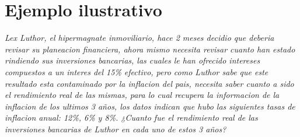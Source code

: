 \section*{Ejemplo ilustrativo}
\textit{Lex Luthor, el hipermagnate inmoviliario, hace 2 meses decidio que deberia revisar su planeacion financiera, ahora mismo necesita revisar cuanto han estado rindiendo sus inversiones bancarias, las cuales le han ofrecido intereses compuestos a un interes del 15\% efectivo, pero como Luthor sabe que este resultado esta contaminado por la inflacion del pais, necesita saber cuanto a sido el rendimiento real de las mismas, para lo cual recupera la informacion de la inflacion de los ultimos 3 años, los datos indican que hubo las siguientes tasas de inflacion anual: 12\%, 6\% y 8\%. ¿Cuanto fue el rendimiento real de las inversiones bancarias de Luthor en cada uno de estos 3 años?}


